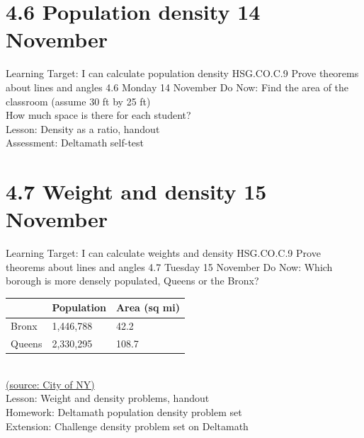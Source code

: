 \section{4.6 Population density \hfill 14 November \,}
\begin{frame}{Learning Target: I can calculate population density}
  {HSG.CO.C.9 Prove theorems about lines and angles  \hfill \alert{4.6 Monday 14 November}}
  Do Now: Find the area of the classroom (assume 30 ft by 25 ft) \\[0.5cm]
  How much space is there for each student? \\[0.5cm]
    Lesson: Density as a ratio, handout \\
    Assessment: Deltamath self-test
\end{frame}

\section{4.7 Weight and density \hfill 15 November \,}
\begin{frame}{Learning Target: I can calculate weights and density}
  {HSG.CO.C.9 Prove theorems about lines and angles  \hfill \alert{4.7 Tuesday 15 November}}
  Do Now: Which borough is more densely populated, Queens or the Bronx? \\[0.5cm]
 
\begin{tabular}{|p{1cm}|p{3cm}|p{2cm}|}
  \hline
   & Population & Area (sq mi)\\
  \hline
  Bronx & 1,446,788 & 42.2  \\
  \hline
  Queens & 2,330,295 & 108.7  \\
  \hline
\end{tabular} \\
\href{https://data.cityofnewyork.us/City-Government/New-York-City-Population-by-Borough-1950-2040/xywu-7bv9/data}{(source: City of NY)} \\[0.5cm]
    Lesson: Weight and density problems, handout \\
    Homework: Deltamath population density problem set \\
    Extension: Challenge density problem set on Deltamath
\end{frame}

